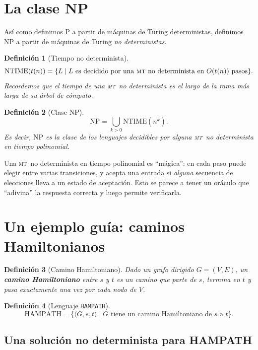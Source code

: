 \documentclass[11pt,a4paper]{article}
\theoremstyle{definicion}
\newtheorem{definicion}{Definición}[section]
\newcommand{\MT}{\textsc{mt}}
\newcommand{\enc}[1]{\langle #1 \rangle}
\newcommand{\NP}{\mathrm{NP}}
\newcommand{\Pclass}{\mathrm{P}}
\begin{document}
\section{La clase NP}

Así como definimos $\Pclass$ a partir de máquinas de Turing deterministas, definimos $\NP$ a partir de máquinas de Turing \emph{no deterministas}.

\begin{definicion}[Tiempo no determinista]
\[
\mathrm{NTIME}(t(n)) = \{ L \mid L \text{ es decidido por una \MT\ no determinista en } O(t(n)) \text{ pasos}\}.
\]
Recordemos que el tiempo de una \MT\ no determinista es el largo de la \emph{rama más larga} de su árbol de cómputo.
\end{definicion}

\begin{definicion}[Clase $\NP$]
\[
\NP = \bigcup_{k > 0} \mathrm{NTIME}(n^k).
\]
Es decir, $\NP$ es la clase de los lenguajes decidibles por alguna \MT\ no determinista en tiempo polinomial.
\end{definicion}

\begin{intuicion}
Una \MT\ no determinista en tiempo polinomial es ``mágica'': en cada paso puede elegir entre varias transiciones, y acepta una entrada si \emph{alguna} secuencia de elecciones lleva a un estado de aceptación. Esto se parece a tener un oráculo que ``adivina'' la respuesta correcta y luego permite verificarla.
\end{intuicion}

\section{Un ejemplo guía: caminos Hamiltonianos}

\begin{definicion}[Camino Hamiltoniano]
Dado un grafo dirigido $G = (V, E)$, un \textbf{camino Hamiltoniano} entre $s$ y $t$ es un camino que parte de $s$, termina en $t$ y pasa \emph{exactamente una vez} por cada nodo de $V$.
\end{definicion}

\begin{definicion}[Lenguaje \texttt{HAMPATH}]
\[
\mathrm{HAMPATH} = \{ \enc{G, s, t} \mid G \text{ tiene un camino Hamiltoniano de } s \text{ a } t\}.
\]
\end{definicion}

\subsection{Una solución no determinista para HAMPATH}
\end{document}
